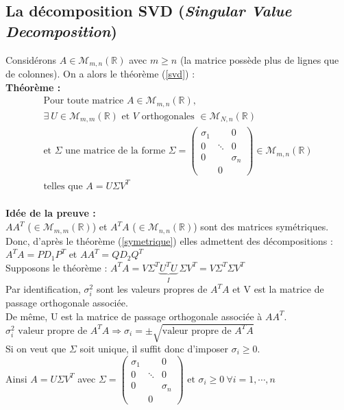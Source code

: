 \documentclass[a4paper,10pt]{report}
\begin{document}
\subsection{La décomposition SVD (\textit{Singular Value Decomposition})}
\noindent Considérons $A \in \mathcal{M}_{m,n}(\mathbb{R})$ avec $m\geq n$ (la matrice possède plus de lignes que de colonnes). On a alors le théorème (\ref{svd}) :\\
\textbf{Théorème :}
\begin{equation}
\label{svd}
\begin{array}{l}
\text{Pour toute matrice } A \in \mathcal{M}_{m,n}(\mathbb{R}), \\
\exists\ U \in \mathcal{M}_{m,m}(\mathbb{R}) \text{ et } V \text{ orthogonales } \in \mathcal{M}_{N,n}(\mathbb{R})\\
\text{et } \Sigma \text{ une matrice de la forme }
\Sigma = \left( \begin{array}{ccc} \sigma_1 & & 0 \\ 0 & \ddots & 0 \\ 0 & & \sigma_n \\ & 0 & \end{array} \right) \in \mathcal{M}_{m,n}(\mathbb{R})\\
\text{telles que } A=U\Sigma V^T
\end{array}
\end{equation}
\\
\textbf{Idée de la preuve :} \\
$AA^T$ ($\in \mathcal{M}_{m,m}(\mathbb{R})$) et $A^TA$ ($\in \mathcal{M}_{n,n}(\mathbb{R})$) sont des matrices symétriques.\\
Donc, d'après le théorème (\ref{symetrique}) elles admettent des décompositions :\\
$A^TA=PD_1P^T$ et $AA^T=QD_2Q^T$\\
Supposons le théorème :
$A^TA = V\Sigma^T \underbrace{U^T U}_I \ \Sigma V^T = V\Sigma^T\Sigma V^T$\\
Par identification, $\sigma_i^2$ sont les valeurs propres de $A^TA$ et V est la matrice de passage orthogonale associée.\\
De même, U est la matrice de passage orthogonale associée à $AA^T$.\\
$\sigma_i^2 \text{ valeur propre de } A^TA \Longrightarrow \sigma_i = \pm \sqrt{\text{valeur propre de } A^TA}$\\
Si on veut que $\Sigma$ soit unique, il suffit donc d'imposer $\sigma_i\geq 0$.\\
Ainsi $A=U\Sigma V^T$ avec $\Sigma = \left( \begin{array}{ccc} \sigma_1 & & 0 \\ 0 & \ddots & 0 \\ 0 & & \sigma_n \\ & 0 & \end{array} \right) \text{ et } \sigma_i\geq 0 \ \forall i=1,\cdots,n$
\end{document}
